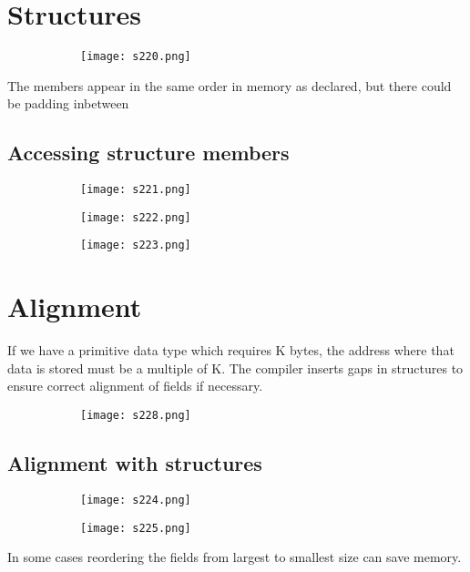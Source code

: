 \documentclass[8pt]{extreport}
\begin{document}
\section{Structures}
\begin{figure}[H]
\centering
\begin{subfigure}[b]{0.4\linewidth}
\texttt{[image: s220.png]}
\end{subfigure}
\end{figure}
The members appear in the same order in memory as declared, but there could be padding inbetween
\subsection{Accessing structure members}
\begin{figure}[H]
\centering
\begin{subfigure}[b]{0.4\linewidth}
\texttt{[image: s221.png]}
\end{subfigure}
\begin{subfigure}[b]{0.4\linewidth}
\texttt{[image: s222.png]}
\end{subfigure}
\begin{subfigure}[b]{0.4\linewidth}
\texttt{[image: s223.png]}
\end{subfigure}
\end{figure}

\section{Alignment}

If we have a primitive data type which requires K bytes, the address where that data is stored must be a multiple of K. The compiler inserts gaps in structures to ensure correct alignment of fields if necessary.
\begin{figure}[H]
\centering
\begin{subfigure}[b]{0.4\linewidth}
\texttt{[image: s228.png]}
\end{subfigure}
\end{figure}

\subsection{Alignment with structures}
\begin{figure}[H]
\centering
\begin{subfigure}[b]{0.4\linewidth}
\texttt{[image: s224.png]}
\end{subfigure}
\begin{subfigure}[b]{0.4\linewidth}
\texttt{[image: s225.png]}
\end{subfigure}
\end{figure}
In some cases reordering the fields from largest to smallest size can save memory.
\end{document}
